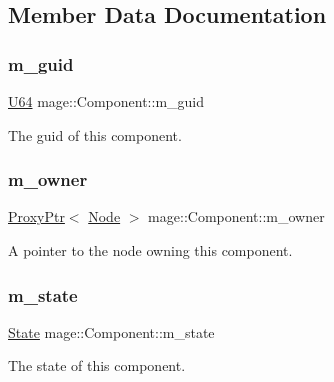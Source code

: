 \subsection{Member Data Documentation}
\hypertarget{classmage_1_1_component_a3ddfe848bbd16a86dbdfd2717c0618da}{}\label{classmage_1_1_component_a3ddfe848bbd16a86dbdfd2717c0618da} 
\subsubsection{\texorpdfstring{m\+\_\+guid}{m\_guid}}
{\footnotesize\ttfamily \hyperlink{namespacemage_a6672cf3c861707ce4a3235a3eb43941d}{U64} mage\+::\+Component\+::m\+\_\+guid\hspace{0.3cm}{\ttfamily [private]}}

The guid of this component. \hypertarget{classmage_1_1_component_ad32770e1f30112cebd2894c1e976a4a7}{}\label{classmage_1_1_component_ad32770e1f30112cebd2894c1e976a4a7} 
\subsubsection{\texorpdfstring{m\+\_\+owner}{m\_owner}}
{\footnotesize\ttfamily \hyperlink{classmage_1_1_proxy_ptr}{Proxy\+Ptr}$<$ \hyperlink{classmage_1_1_node}{Node} $>$ mage\+::\+Component\+::m\+\_\+owner\hspace{0.3cm}{\ttfamily [private]}}

A pointer to the node owning this component. \hypertarget{classmage_1_1_component_a541a035d18f4d9f3873996716a8192d5}{}\label{classmage_1_1_component_a541a035d18f4d9f3873996716a8192d5} 
\subsubsection{\texorpdfstring{m\+\_\+state}{m\_state}}
{\footnotesize\ttfamily \hyperlink{namespacemage_ae47d13d8477ee94893b9a3947d28eebc}{State} mage\+::\+Component\+::m\+\_\+state\hspace{0.3cm}{\ttfamily [private]}}

The state of this component. 